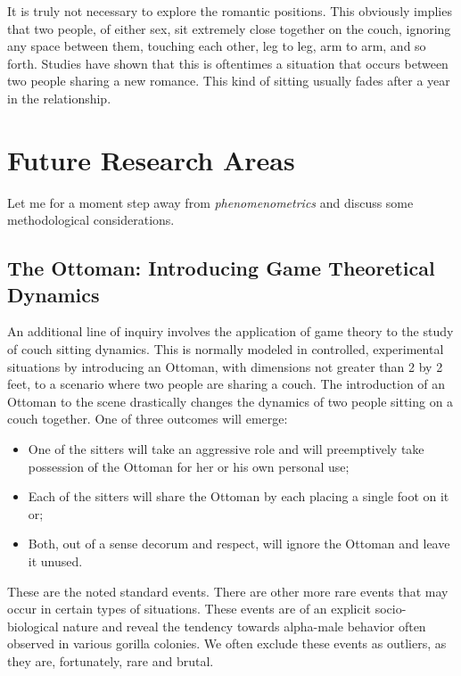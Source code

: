 \documentclass[12pt]{article}
\begin{document}
It is truly not necessary to explore the romantic positions. This
obviously implies that two people, of either sex, sit extremely
close together on the couch, ignoring any space between them,
touching each other, leg to leg, arm to arm, and so forth. Studies
have shown that this is oftentimes a situation that occurs between
two people sharing a new romance. This kind of sitting usually
fades after a year in the relationship.

\section{Future Research Areas}


Let me for a moment step away from \emph{phenomenometrics} and
discuss some methodological considerations.

\subsection{The Ottoman: Introducing Game Theoretical Dynamics}


An additional line of inquiry involves the application of game
theory to the study of couch sitting dynamics. This is normally
modeled in controlled, experimental situations by introducing an
Ottoman, with dimensions not greater than 2 by 2 feet, to a
scenario where two people are sharing a couch. The introduction of
an Ottoman to the scene drastically changes the dynamics of two
people sitting on a couch together.  One of three outcomes will
emerge: 

\begin{itemize}

\item One of the sitters will take an aggressive role and will
    preemptively take possession of the Ottoman for her or his own
    personal use; 

\item Each of the sitters will share the Ottoman by each placing a
    single foot on it or; 

\item Both, out of a sense decorum and respect, will ignore the
    Ottoman and leave it unused.

\end{itemize}

These are the noted standard events. There are other more rare
events that may occur in certain types of situations. These events
are of an explicit socio-biological nature and reveal the tendency
towards alpha-male behavior often observed in various gorilla
colonies. We often exclude these events as outliers, as they are,
fortunately, rare and brutal.
\end{document}
